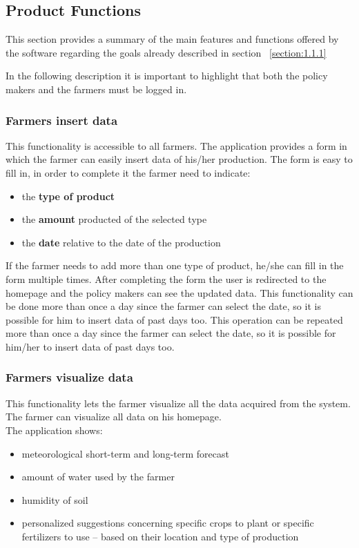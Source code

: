 \documentclass{article}
\begin{document}
\subsection{Product Functions}
\label{subsection:2.2}
This section provides a summary of the main features and 
functions offered by the software regarding
the goals already described in section ~\ref{section:1.1.1}

In the following description it is important to highlight that both
the policy makers and the farmers must be logged in.

\subsubsection{Farmers insert data} 
This functionality is accessible to all farmers. 
The application provides a form in which the farmer can easily insert data of his/her production.
The form is easy to fill in, in order to complete it the farmer need to indicate:
\begin{itemize}
    \item the \textbf{type of product}
    \item the \textbf{amount} producted of the selected type
    \item the \textbf{date} relative to the date of the production
\end{itemize}
If the farmer needs to add more than one type of product, 
he/she can fill in the form multiple times.
After completing the form the user is redirected to the homepage and the policy makers 
can see the updated data.
This functionality can be done more than once a day since the farmer can select the date, 
so it is possible for him to insert data of past days too.
This operation can be repeated more than once a day since the farmer can select the date, so it is possible for him/her to insert data of past days too.



\subsubsection{Farmers visualize data}
This functionality lets the farmer visualize all the data 
acquired from the system. The farmer can visualize all data on his homepage.\\
The application shows:
\begin{itemize}
    \item meteorological  short-term and long-term forecast
    \item amount of water used by the farmer
    \item humidity of soil 
    \item personalized suggestions concerning specific crops to plant or specific 
    fertilizers to use – based on their location and type of production
\end{itemize}
\end{document}
